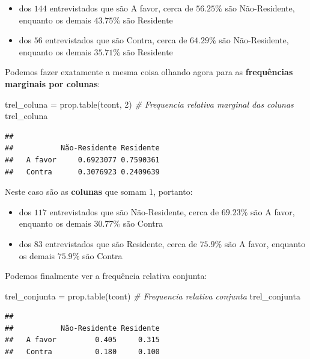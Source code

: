 \documentclass[
]{book}
\newenvironment{Shaded}{\begin{snugshade}}{\end{snugshade}}
\newcommand{\CommentTok}[1]{\textcolor[rgb]{0.56,0.35,0.01}{\textit{#1}}}
\newcommand{\DecValTok}[1]{\textcolor[rgb]{0.00,0.00,0.81}{#1}}
\newcommand{\FunctionTok}[1]{\textcolor[rgb]{0.00,0.00,0.00}{#1}}
\newcommand{\NormalTok}[1]{#1}
\newcommand{\OtherTok}[1]{\textcolor[rgb]{0.56,0.35,0.01}{#1}}
\begin{document}
\begin{itemize}
\item
  dos \(144\) entrevistados que são A favor, cerca de \(56.25\%\) são Não-Residente, enquanto os demais \(43.75\%\) são Residente
\item
  dos \(56\) entrevistados que são Contra, cerca de \(64.29\%\) são Não-Residente, enquanto os demais \(35.71\%\) são Residente
\end{itemize}

Podemos fazer exatamente a mesma coisa olhando agora para as \textbf{frequências marginais por colunas}:

\begin{Shaded}
\begin{Highlighting}[]
\NormalTok{trel\_coluna }\OtherTok{=} \FunctionTok{prop.table}\NormalTok{(tcont, }\DecValTok{2}\NormalTok{) }\CommentTok{\# Frequencia relativa marginal das colunas}
\NormalTok{trel\_coluna}
\end{Highlighting}
\end{Shaded}

\begin{verbatim}
##          
##           Não-Residente Residente
##   A favor     0.6923077 0.7590361
##   Contra      0.3076923 0.2409639
\end{verbatim}

Neste caso são as \textbf{colunas} que somam \(1\), portanto:

\begin{itemize}
\item
  dos \(117\) entrevistados que são Não-Residente, cerca de \(69.23\%\) são A favor, enquanto os demais \(30.77\%\) são Contra
\item
  dos \(83\) entrevistados que são Residente, cerca de \(75.9\%\) são A favor, enquanto os demais \(75.9\%\) são Contra
\end{itemize}

Podemos finalmente ver a frequência relativa conjunta:

\begin{Shaded}
\begin{Highlighting}[]
\NormalTok{trel\_conjunta }\OtherTok{=} \FunctionTok{prop.table}\NormalTok{(tcont) }\CommentTok{\# Frequencia relativa conjunta}
\NormalTok{trel\_conjunta}
\end{Highlighting}
\end{Shaded}

\begin{verbatim}
##          
##           Não-Residente Residente
##   A favor         0.405     0.315
##   Contra          0.180     0.100
\end{verbatim}
\end{document}
